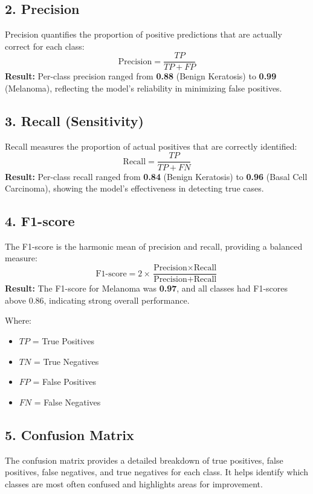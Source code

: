 \documentclass[a4paper,12pt]{report}
\begin{document}
\begin{spacing}{1.5}
    \subsection*{2. Precision}
    Precision quantifies the proportion of positive predictions that are actually correct for each class:
    \[
        \text{Precision} = \frac{TP}{TP + FP}
    \]
    \textbf{Result:} Per-class precision ranged from \textbf{0.88} (Benign Keratosis) to \textbf{0.99} (Melanoma), reflecting the model's reliability in minimizing false positives.

    \subsection*{3. Recall (Sensitivity)}
    Recall measures the proportion of actual positives that are correctly identified:
    \[
        \text{Recall} = \frac{TP}{TP + FN}
    \]
    \textbf{Result:} Per-class recall ranged from \textbf{0.84} (Benign Keratosis) to \textbf{0.96} (Basal Cell Carcinoma), showing the model's effectiveness in detecting true cases.

    \subsection*{4. F1-score}
    The F1-score is the harmonic mean of precision and recall, providing a balanced measure:
    \[
        \text{F1-score} = 2 \times \frac{\text{Precision} \times \text{Recall}}{\text{Precision} + \text{Recall}}
    \]
    \textbf{Result:} The F1-score for Melanoma was \textbf{0.97}, and all classes had F1-scores above 0.86, indicating strong overall performance.
    
    Where:
    \begin{itemize}
        \item $TP$ = True Positives
        \item $TN$ = True Negatives
        \item $FP$ = False Positives
        \item $FN$ = False Negatives
    \end{itemize}
    
    \subsection*{5. Confusion Matrix}
    The confusion matrix provides a detailed breakdown of true positives, false positives, false negatives, and true negatives for each class. It helps identify which classes are most often confused and highlights areas for improvement.


\end{spacing}
\end{document}
